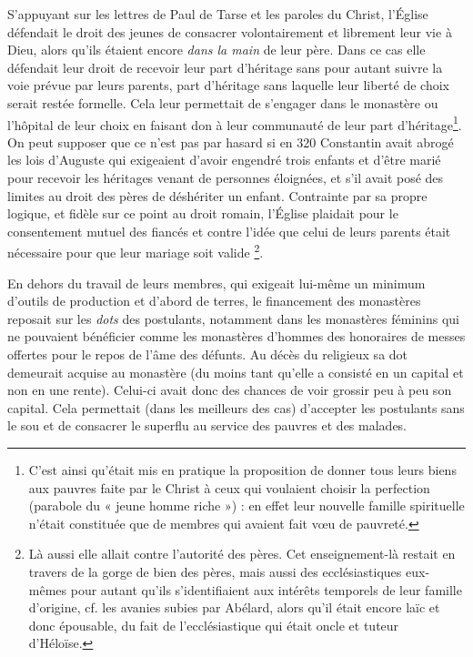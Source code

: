  S'appuyant sur les lettres de Paul de Tarse et les paroles du Christ, l'Église défendait le droit des jeunes de consacrer volontairement et librement leur vie à Dieu, alors qu'ils étaient encore \emph{dans la main} de leur père. Dans ce cas elle défendait leur droit de recevoir leur part d'héritage sans pour autant suivre la voie prévue par leurs parents, part d'héritage sans laquelle leur liberté de choix serait restée formelle. Cela leur permettait de s'engager dans le monastère ou l'hôpital de leur choix en faisant don à leur communauté de leur part d'héritage\footnote{C'est ainsi qu'était mis en pratique la proposition de donner tous leurs biens aux pauvres faite par le Christ à ceux qui voulaient choisir la perfection (parabole du « jeune homme riche ») : en effet leur nouvelle famille spirituelle n'était constituée que de membres qui avaient fait vœu de pauvreté.}. On peut supposer que ce n'est pas par hasard si en 320 Constantin avait abrogé les lois d'Auguste qui exigeaient d'avoir engendré trois enfants et d'être marié pour recevoir les héritages venant de personnes éloignées, et s'il avait posé des limites au droit des pères de déshériter un enfant. Contrainte par sa propre logique, et fidèle sur ce point au droit romain, l'Église plaidait pour le consentement mutuel des fiancés et contre l'idée que celui de leurs parents était nécessaire pour que leur mariage soit valide
\footnote{Là aussi elle allait contre l'autorité des pères. Cet enseignement-là restait en travers de la gorge de bien des pères, mais aussi des ecclésiastiques eux-mêmes pour autant qu'ils s'identifiaient aux intérêts temporels de leur famille d'origine, cf. les avanies subies par Abélard, alors qu'il était encore laïc et donc épousable, du fait de l'ecclésiastique qui était oncle et tuteur d'Héloïse.}.

En dehors du travail de leurs membres, qui exigeait lui-même un minimum d'outils de production et d'abord de terres, le financement des monastères reposait sur les \emph{dots} des postulants, notamment dans les monastères féminins qui ne pouvaient bénéficier comme les monastères d'hommes des honoraires de messes offertes pour le repos de l'âme des défunts. Au décès du religieux sa dot demeurait acquise au monastère (du moins tant qu'elle a consisté en un capital et non en une rente). Celui-ci avait donc des chances de voir grossir peu à peu son capital. Cela permettait (dans les meilleurs des cas) d'accepter les postulants sans le sou et de consacrer le superflu au service des pauvres et des malades.

